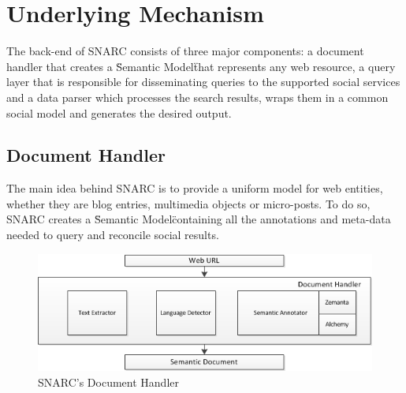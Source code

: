\documentclass[oribibl]{llncs}
\begin{document}

\section{Underlying Mechanism}
The back-end of SNARC consists of three major components: a document handler that creates a \"Semantic Model\" that represents any web resource, a query layer that is responsible for disseminating queries to the supported social services and a data parser which processes the search results, wraps them in a common social model and generates the desired output.

\subsection{Document Handler}
The main idea behind SNARC is to provide a uniform model for web entities, whether they are blog entries, multimedia objects or micro-posts. To do so, SNARC creates a \"Semantic Model\" containing all the annotations and meta-data needed to query and reconcile social results.
\begin{figure}[h!]
  \centering
    \includegraphics[scale=0.8]{architecture-part1.png}
  \caption{SNARC's Document Handler}
  \label{fig:1}
\end{figure}
\end{document}
